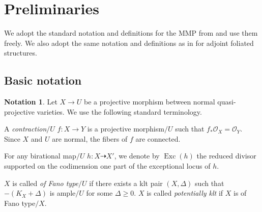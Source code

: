 \documentclass[11pt,reqno]{amsart}
\numberwithin{equation}{section}
\newcommand{\Exc}{\operatorname{Exc}}
\theoremstyle{definition}
\newtheorem{nota}[thm]{Notation}
\begin{document}
\section{Preliminaries}\label{sec: preliminaries}

We adopt the standard notation and definitions for the MMP from \cite{Sho92,KM98,BCHM10} and use them freely. We also adopt the same notation and definitions as in \cite{Cas+24,Cas+25a} for adjoint foliated structures.

\subsection{Basic notation}

\begin{nota}
Let $X\rightarrow U$ be a projective morphism between normal quasi-projective varieties.
We use the following standard terminology.

A \emph{contraction}$/U$ $f: X\rightarrow Y$ is a projective morphism$/U$ such that $f_\ast \mathcal{O}_X=\mathcal{O}_Y$.
Since $X$ and $U$ are normal, the fibers of $f$ are connected.

For any birational map$/U$ $h\colon X\dashrightarrow X'$, we denote by $\Exc(h)$ the reduced divisor supported on the codimension one part of the exceptional locus of $h$.

$X$ is called \emph{of Fano type}$/U$ if there exists a klt pair $(X,\Delta)$ such that $-(K_X+\Delta)$ is ample$/U$ for some $\Delta\geq 0$. 
$X$ is called \emph{potentially klt} if $X$ is of Fano type$/X$.
\end{nota}
\end{document}
